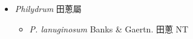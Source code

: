 
  \begin{itemize}
 \item[] \textit{Philydrum} 田蔥屬
                                
  \begin{itemize}
        \item[] \textit{P. lanuginosum} Banks \& Gaertn.  田蔥   NT
  \end{itemize}
  \end{itemize}
